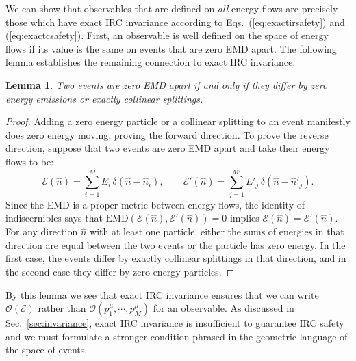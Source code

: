 \documentclass[letterpaper,11pt]{article}
\newcommand{\E}{\mathcal{E}}
\DeclareRobustCommand{\Sec}[1]{Sec.~\ref{#1}}
\DeclareRobustCommand{\Eqs}[2]{Eqs.~(\ref{#1}) and (\ref{#2})}
\newtheorem{lemma}{Lemma}
\newcommand{\EMD}{\text{EMD}\xspace}
\begin{document}
We can show that observables that are defined on \emph{all} energy flows are precisely those which have exact IRC invariance according to \Eqs{eq:exactirsafety}{eq:exactcsafety}.
%
First, an observable is well defined on the space of energy flows if its value is the same on events that are zero EMD apart. 
% 
The following lemma establishes the remaining connection to exact IRC invariance.
%
\begin{lemma}
Two events are zero EMD apart if and only if they differ by zero energy emissions or exactly collinear splittings.
\end{lemma}
%
\begin{proof}
Adding a zero energy particle or a collinear splitting to an event manifestly does zero energy moving, proving the forward direction.
%
To prove the reverse direction, suppose that two events are zero EMD apart and take their energy flows to be:
\begin{equation}
\mathcal E(\hat n) = \sum_{i=1}^M E_i\,\delta(\hat n - \hat n_i),\quad\quad \mathcal E'(\hat n) = \sum_{j=1}^{M'} E'_j \,\delta(\hat n - \hat n'_j).
\end{equation}
%
Since the EMD is a proper metric between energy flows, the identity of indiscernibles says that $\EMD(\E(\hat n),\E'(\hat n))=0$ implies $\E(\hat n)=\E'(\hat n)$.
%
For any direction $\hat n$ with at least one particle, either the sums of energies in that direction are equal between the two events or the particle has zero energy.
%
In the first case, the events differ by exactly collinear splittings in that direction, and in the second case they differ by zero energy particles.
\end{proof}
%
By this lemma we see that exact IRC invariance ensures that we can write $\mathcal O(\mathcal E)$ rather than $\mathcal O(p_1^\mu, \cdots, p_M^\mu)$ for an observable.
%
As discussed in \Sec{sec:invariance}, exact IRC invariance is insufficient to guarantee IRC safety and we must formulate a stronger condition phrased in the geometric language of the space of events.
\end{document}
